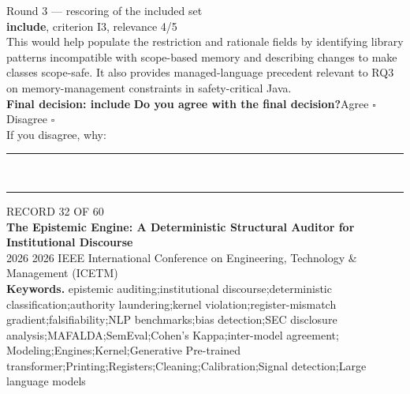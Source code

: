 \documentclass[11pt,a4paper]{article}
\begin{document}
{\footnotesize\color{soft}Round 3 --- rescoring of the included set}\\[0.5mm]
{\small\textbf{include}, criterion I3, relevance 4/5}\\[0.5mm]
{\small This would help populate the restriction and rationale fields by identifying library patterns incompatible with scope-based memory and describing changes to make classes scope-safe. It also provides managed-language precedent relevant to RQ3 on memory-management constraints in safety-critical Java.}\\[2.5mm]
{\small\textbf{Final decision: include}}
\vspace{2mm}
{\small\textbf{Do you agree with the final decision?}\quad{}Agree $\square$\qquad{}Disagree $\square$}\\[1mm]
{\footnotesize\color{soft}If you disagree, why:}\\[1mm]
\color{rule}\rule{\linewidth}{0.3pt}\\[3mm]\rule{\linewidth}{0.3pt}\color{black}
\clearpage
{\color{soft}\footnotesize RECORD 32 OF 60}\\[1mm]
{\large\bfseries The Epistemic Engine: A Deterministic Structural Auditor for Institutional Discourse}\\[1.5mm]
{\color{soft}\small 2026 \textperiodcentered{} 2026 IEEE International Conference on Engineering, Technology \& Management (ICETM)}\\[2mm]
{\small\textbf{Keywords.} epistemic auditing;institutional discourse;deterministic classification;authority laundering;kernel violation;register-mismatch gradient;falsifiability;NLP benchmarks;bias detection;SEC disclosure analysis;MAFALDA;SemEval;Cohen's Kappa;inter-model agreement; Modeling;Engines;Kernel;Generative Pre-trained transformer;Printing;Registers;Cleaning;Calibration;Signal detection;Large language models}\\[2mm]
\end{document}
